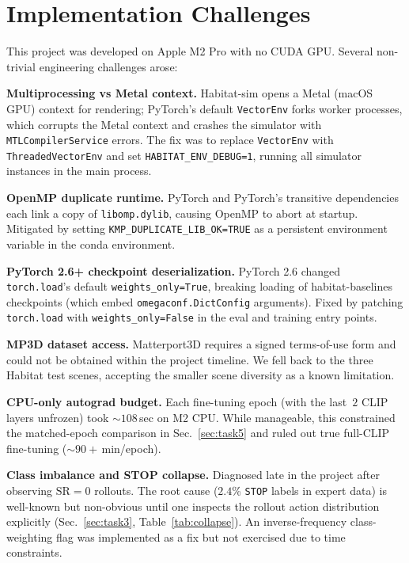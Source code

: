 \documentclass[10pt, twocolumn]{article}
\begin{document}
\section{Implementation Challenges}\label{sec:challenges}

This project was developed on Apple M2 Pro with no CUDA GPU. Several
non-trivial engineering challenges arose:

\textbf{Multiprocessing vs Metal context.} Habitat-sim opens a Metal
(macOS GPU) context for rendering; PyTorch's default \texttt{VectorEnv}
forks worker processes, which corrupts the Metal context and crashes
the simulator with \texttt{MTLCompilerService} errors. The fix was to
replace \texttt{VectorEnv} with \texttt{ThreadedVectorEnv} and set
\texttt{HABITAT\_ENV\_DEBUG=1}, running all simulator instances in the
main process.

\textbf{OpenMP duplicate runtime.} PyTorch and PyTorch's transitive
dependencies each link a copy of \texttt{libomp.dylib}, causing OpenMP
to abort at startup. Mitigated by setting
\texttt{KMP\_DUPLICATE\_LIB\_OK=TRUE} as a persistent environment
variable in the conda environment.

\textbf{PyTorch 2.6+ checkpoint deserialization.} PyTorch 2.6 changed
\texttt{torch.load}'s default \texttt{weights\_only=True}, breaking
loading of habitat-baselines checkpoints (which embed
\texttt{omegaconf.DictConfig} arguments). Fixed by patching
\texttt{torch.load} with \texttt{weights\_only=False} in the eval and
training entry points.

\textbf{MP3D dataset access.} Matterport3D requires a signed terms-of-use
form and could not be obtained within the project timeline. We fell
back to the three Habitat test scenes, accepting the smaller scene
diversity as a known limitation.

\textbf{CPU-only autograd budget.} Each fine-tuning epoch (with the
last~$2$ CLIP layers unfrozen) took $\sim\!108$\,sec on M2 CPU. While
manageable, this constrained the matched-epoch comparison in
Sec.~\ref{sec:task5} and ruled out true full-CLIP fine-tuning
($\sim\!90+$\,min/epoch).

\textbf{Class imbalance and STOP collapse.} Diagnosed late in the
project after observing $\mathrm{SR}=0$ rollouts. The root cause
($2.4$\% \texttt{STOP} labels in expert data) is well-known but
non-obvious until one inspects the rollout action distribution
explicitly (Sec.~\ref{sec:task3}, Table~\ref{tab:collapse}). An
inverse-frequency class-weighting flag was implemented as a fix but
not exercised due to time constraints.
\end{document}
